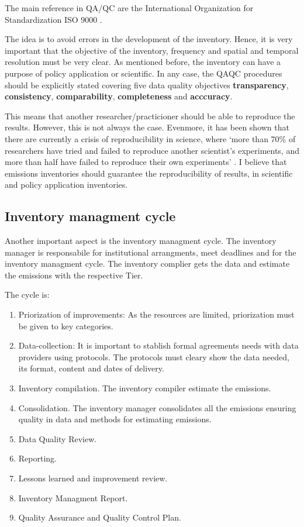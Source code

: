 \documentclass[12pt,graybox,envcountchap,sectrefs]{krantz}
\providecommand{\tightlist}{%
  \setlength{\itemsep}{0pt}\setlength{\parskip}{0pt}}
\theoremstyle{definition}
\theoremstyle{definition}
\theoremstyle{definition}
\theoremstyle{remark}
\begin{document}
The main reference in QA/QC are the International Organization for
Standardization ISO 9000 \citep{wiki:iso}.

The idea is to avoid errors in the development of the inventory. Hence,
it is very important that the objective of the inventory, frequency and
spatial and temporal resolution must be very clear. As mentioned before,
the inventory can have a purpose of policy application or scientific. In
any case, the QAQC procedures should be explicitly stated covering five
data quality objectives \textbf{transparency}, \textbf{consistency},
\textbf{comparability}, \textbf{completeness} and \textbf{acccuracy}.

This means that another researcher/practicioner should be able to
reproduce the results. However, this is not always the case. Evenmore,
it has been shown that there are currently a crisis of reproducibility
in science, where `more than 70\% of researchers have tried and failed
to reproduce another scientist's experiments, and more than half have
failed to reproduce their own experiments' \citep{baker2016there}. I
believe that emissions inventories should guarantee the reproducibility
of results, in scientific and policy application inventories.

\subsection{Inventory managment cycle}\label{inventory-managment-cycle}

Another important aspect is the inventory managment cycle. The inventory
manager is responsabile for institutional arrangments, meet deadlines
and for the inventory managment cycle. The inventory complier gets the
data and estimate the emissions with the respective Tier.

The cycle is:

\begin{enumerate}
\def\labelenumi{\arabic{enumi}.}
\tightlist
\item
  Priorization of improvements: As the resources are limited,
  priorization must be given to key categories.
\item
  Data-collection: It is important to stablish formal agreements needs
  with data providers using protocols. The protocols must cleary show
  the data needed, its format, content and dates of delivery.
\item
  Inventory compilation. The inventory compiler estimate the emissions.
\item
  Consolidation. The inventory manager consolidates all the emissions
  ensuring quality in data and methods for estimating emissions.
\item
  Data Quality Review.
\item
  Reporting.
\item
  Lessons learned and improvement review.
\item
  Inventory Managment Report.
\item
  Quality Assurance and Quality Control Plan.
\end{enumerate}
\end{document}
